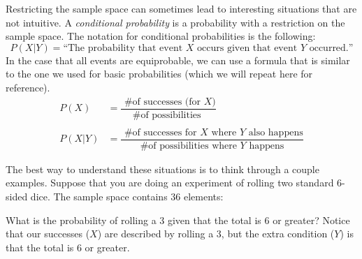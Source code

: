 \documentclass{ximera}
\begin{document}
Restricting the sample space can sometimes lead to interesting situations that are not intuitive. A \emph{conditional probability} is a probability with a restriction on the sample space. The notation for conditional probabilities is the following:
\[ P(X | Y) = \text{``The probability that event $X$ occurs given that event $Y$ occurred.''} \]
In the case that all events are equiprobable, we can use a formula that is similar to the one we used for basic probabilities (which we will repeat here for reference).
\begin{align*}
  P(X) & = \dfrac{ \text{ \# of successes (for $X$)}}{ \text{\# of possibilities } } \\ \\
  P(X | Y) & = \dfrac{ \text{ \# of successes for $X$ where $Y$ also happens}}{ \text{\# of possibilities where $Y$ happens}}
\end{align*}

The best way to understand these situations is to think through a couple examples. Suppose that you are doing an experiment of rolling two standard 6-sided dice. The sample space contains 36 elements:
\begin{image}
\end{image}

What is the probability of rolling a 3 given that the total is 6 or greater? Notice that our successes ($X$) are described by rolling a 3, but the extra condition ($Y$) is that the total is 6 or greater.
\end{document}
